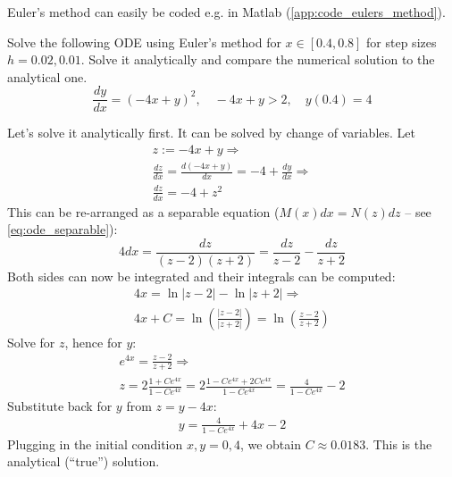 \documentclass[a4paper]{article}
\begin{document}
Euler's method can easily be coded e.g. in Matlab (\ref{app:code_eulers_method}).

\begin{exmp}
Solve the following ODE using Euler's method for $x\in [0.4,0.8]$ for step sizes $h=0.02,0.01$. Solve it analytically and compare the numerical solution to the analytical one. 
\[
\frac{dy}{dx} = (-4x+y)^2, \quad -4x + y > 2, \quad y(0.4) = 4
\]
\end{exmp}
\begin{soln}
Let's solve it analytically first. It can be solved by change of variables. Let
\begin{gather*}
    z := -4x + y \Rightarrow \\
    \frac{dz}{dx} = \frac{d(-4x + y)}{dx} = -4 + \frac{dy}{dx} \Rightarrow \\
    \frac{dz}{dx} = -4 + z^2
\end{gather*}
This can be re-arranged as a separable equation ($M(x)dx = N(z)dz$ -- see \eqref{eq:ode_separable}):
\[
4dx = \frac{dz}{(z-2)(z+2)} = \frac{dz}{z-2} -  \frac{dz}{z+2}  
\]
Both sides can now be integrated and their integrals can be computed:
\begin{gather*}
    4x = \ln\left|z-2 \right| - \ln\left|z+2 \right|\Rightarrow \\
    4x + C = \ln \left(\frac{\left|z-2 \right|}{\left|z+2 \right|} \right) = \ln \left(\frac{z-2}{z+2} \right)
\end{gather*}
Solve for $z$, hence for $y$:
\begin{gather*}
    e^{4x} = \frac{z-2}{z+2} \Rightarrow \\
    z = 2 \frac{1+Ce^{4x}}{1-Ce^{4x}} =   2 \frac{1-Ce^{4x} + 2Ce^{4x}}{1-Ce^{4x}} = \frac{4}{1-Ce^{4x}} -2
\end{gather*}
Substitute back for $y$ from $z = y-4x$:
\begin{gather*}
    y = \frac{4}{1-Ce^{4x}} + 4x - 2
    \tag{1}
\end{gather*}
Plugging in the initial condition $x,y=0,4$, we obtain $C\approx 0.0183 $. This is the analytical (``true'') solution.


\end{soln}
\end{document}
